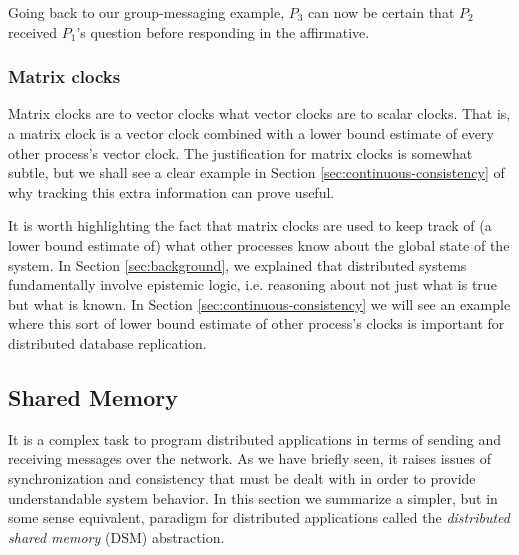\documentclass[]             %
{NASA}                       %
\theoremstyle{definition}
\begin{document}
Going back to our group-messaging example, $P_3$ can now be certain
that $P_2$ received $P_1$'s question before responding in the
affirmative.




\subsubsection{Matrix clocks}

Matrix clocks are to vector clocks what vector clocks are to scalar
clocks. That is, a matrix clock is a vector clock combined with a
lower bound estimate of every other process's vector clock. The
justification for matrix clocks is somewhat subtle, but we shall see a
clear example in Section \ref{sec:continuous-consistency} of why
tracking this extra information can prove useful.

It is worth highlighting the fact that matrix clocks are used to keep
track of (a lower bound estimate of) what other processes know about
the global state of the system. In Section \ref{sec:background}, we
explained that distributed systems fundamentally involve epistemic
logic, i.e. reasoning about not just what is true but what is
known. In Section \ref{sec:continuous-consistency} we will see an
example where this sort of lower bound estimate of other process's
clocks is important for distributed database replication.

\subsection{Shared Memory}
It is a complex task to program distributed applications in terms of
sending and receiving messages over the network. As we have briefly
seen, it raises issues of synchronization and consistency that must be
dealt with in order to provide understandable system behavior. In this
section we summarize a simpler, but in some sense equivalent, paradigm
for distributed applications called the \emph{distributed shared
memory} (DSM) abstraction.
\end{document}

